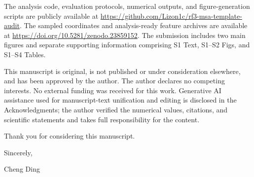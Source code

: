\documentclass[11pt,a4paper]{article}
\begin{document}
The analysis code, evaluation protocols, numerical outputs, and figure-generation scripts are publicly available at \url{https://github.com/Lizon1c/rf3-msa-template-audit}. The sampled coordinates and analysis-ready feature archives are available at \url{https://doi.org/10.5281/zenodo.23859152}. The submission includes two main figures and separate supporting information comprising S1 Text, S1--S2 Figs, and S1--S4 Tables.

This manuscript is original, is not published or under consideration elsewhere, and has been approved by the author. The author declares no competing interests. No external funding was received for this work. Generative AI assistance used for manuscript-text unification and editing is disclosed in the Acknowledgments; the author verified the numerical values, citations, and scientific statements and takes full responsibility for the content.

Thank you for considering this manuscript.

Sincerely,

Cheng Ding
\end{document}
